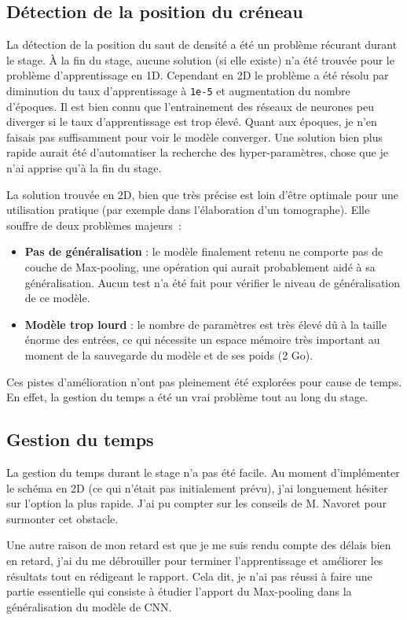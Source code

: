 \subsection{Détection de la position du créneau}
La détection de la position du saut de densité a été un problème récurant durant le stage. À la fin du stage, aucune solution (si elle existe) n'a été trouvée pour le problème d'apprentissage en 1D. Cependant en 2D le problème a été résolu par diminution du taux d'apprentissage à \verb|1e-5| et augmentation du nombre d'époques. Il est bien connu que l'entrainement des réseaux de neurones peu diverger si le taux d'apprentissage est trop élevé. Quant aux époques, je n'en faisais pas suffisamment pour voir le modèle converger. Une solution bien plus rapide aurait été d'automatiser la recherche des hyper-paramètres, chose que je n'ai apprise qu'à la fin du stage.

La solution trouvée en 2D, bien que très précise est loin d'être optimale pour une utilisation pratique (par exemple dans l'élaboration d'un tomographe). Elle souffre de deux problèmes majeurs :
\begin{itemize}
 \item \textbf{Pas de généralisation} : le modèle finalement retenu ne comporte pas de couche de Max-pooling, une opération qui aurait probablement aidé à sa généralisation. Aucun test n'a été fait pour vérifier le niveau de généralisation de ce modèle.
 \item \textbf{Modèle trop lourd} : le nombre de paramètres est très élevé dû à la taille énorme des entrées, ce qui nécessite un espace mémoire très important au moment de la sauvegarde du modèle et de ses poids (2 Go).
\end{itemize}

Ces pistes d'amélioration n'ont pas pleinement été explorées pour cause de temps. En effet, la gestion du temps a été un vrai problème tout au long du stage.

\subsection{Gestion du temps}
La gestion du temps durant le stage n'a pas été facile. Au moment d'implémenter le schéma en 2D (ce qui n'était pas initialement prévu), j'ai longuement hésiter sur l'option la plus rapide. J'ai pu compter sur les conseils de M. Navoret pour surmonter cet obstacle. 

Une autre raison de mon retard est que je me suis rendu compte des délais bien en retard, j'ai du me débrouiller pour terminer l'apprentissage et améliorer les résultats tout en rédigeant le rapport. Cela dit, je n'ai pas réussi à faire une partie essentielle qui consiste à étudier l'apport du Max-pooling dans la généralisation du modèle de CNN.

